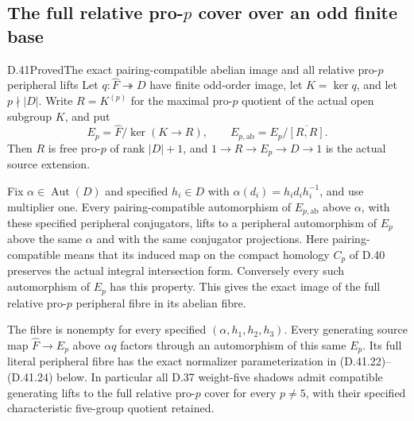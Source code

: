 \subsection{The full relative pro-\texorpdfstring{\(p\)}{p} cover over an odd finite base}

\begin{statement}{D.41}{Proved}{The exact pairing-compatible abelian image and all relative pro-$p$ peripheral lifts}
Let \(q:\widehat F\twoheadrightarrow D\) have finite odd-order
image, let \(K=\ker q\), and let \(p\nmid |D|\).
Write \(R=K^{(p)}\) for the maximal pro-\(p\) quotient of the
actual open subgroup \(K\), and put
\[
 E_p=\widehat F/\ker(K\to R),\qquad
 E_{p,\mathrm{ab}}=E_p/\overline{[R,R]}.
 \tag{D.41.1}
\]
Then \(R\) is free pro-\(p\) of rank \(|D|+1\), and
\(1\to R\to E_p\to D\to1\) is the actual source extension.

Fix \(\alpha\in\operatorname{Aut}(D)\) and specified
\(h_i\in D\) with
\(\alpha(d_i)=h_i d_i h_i^{-1}\), and use multiplier one.
Every pairing-compatible automorphism of
\(E_{p,\mathrm{ab}}\) above \(\alpha\), with these specified
peripheral conjugators, lifts to a peripheral automorphism
of \(E_p\) above the same \(\alpha\) and with the same
conjugator projections.
Here pairing-compatible means that its induced map on
the compact homology \(C_p\) of D.40 preserves the
actual integral intersection form.
Conversely every such automorphism of \(E_p\) has this
property.  This gives the exact image of the full relative
pro-\(p\) peripheral fibre in its abelian fibre.

The fibre is nonempty for every specified
\((\alpha,h_1,h_2,h_3)\).
Every generating source map
\(\widehat F\to E_p\) above \(\alpha q\) factors through
an automorphism of this same \(E_p\).
Its full literal peripheral fibre has the exact
normalizer parameterization in
\textup{(D.41.22)--(D.41.24)} below.
In particular all D.37 weight-five shadows admit
compatible generating lifts to the full relative
pro-\(p\) cover for every \(p\ne5\), with their
specified characteristic five-group quotient retained.
\end{statement}

